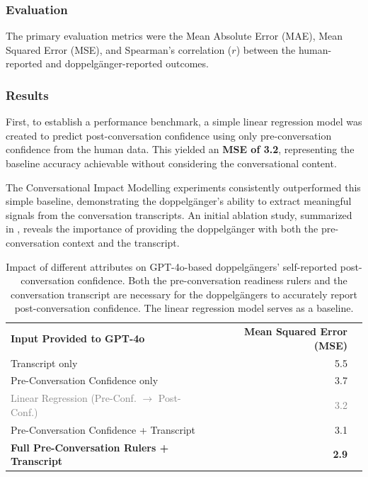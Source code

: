 \subsubsection{Evaluation}
The primary evaluation metrics were the Mean Absolute Error (MAE), Mean Squared Error (MSE), and Spearman's correlation ($r$) between the human-reported and doppelgänger-reported outcomes.

\subsubsection{Results}
First, to establish a performance benchmark, a simple linear regression model was created to predict post-conversation confidence using only pre-conversation confidence from the human data. This yielded an \textbf{MSE of 3.2}, representing the baseline accuracy achievable without considering the conversational content.

The Conversational Impact Modelling experiments consistently outperformed this simple baseline, demonstrating the doppelgänger's ability to extract meaningful signals from the conversation transcripts. An initial ablation study, summarized in , reveals the importance of providing the doppelgänger with both the pre-conversation context and the transcript.



\begin{table}[ht!]
	\centering
	\begin{tabular}{@{}lrr@{}}
		\cmidrule(r){1-2}
		\textbf{Input Provided to GPT-4o}                                        & \textbf{Mean Squared Error (MSE)} & \\
		\cmidrule(r){1-2}
		Transcript only                                                          & 5.5                               & \\
		Pre-Conversation Confidence only                                         & 3.7                               & \\
		\textcolor{gray}{Linear Regression (Pre-Conf. $\rightarrow$ Post-Conf.)} & \textcolor{gray}{3.2}             & \\
		Pre-Conversation Confidence + Transcript                                 & 3.1                               & \\
		\textbf{Full Pre-Conversation Rulers + Transcript}                       & \textbf{2.9}                      & \\
		\cmidrule(r){1-2}
	\end{tabular}
	\caption[Ablation study on doppelgängers' self-reported post-conversation confidence]{Impact of different attributes on GPT-4o-based doppelgängers' self-reported post-conversation confidence. Both the pre-conversation readiness rulers and the conversation transcript are necessary for the doppelgängers to accurately report post-conversation confidence. The linear regression model serves as a baseline.}
	\label{tab:ablation_results}
\end{table}



